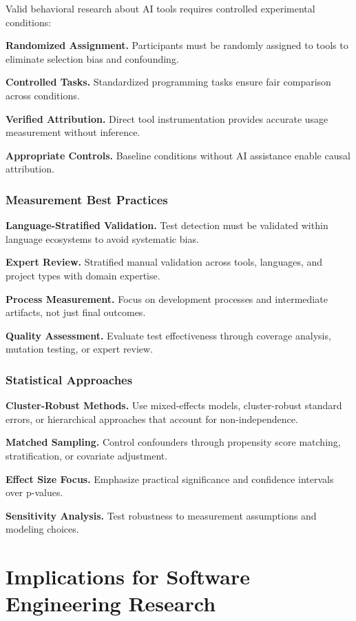 \documentclass[conference]{IEEEtran}
\begin{document}
Valid behavioral research about AI tools requires controlled experimental conditions:

\textbf{Randomized Assignment.} Participants must be randomly assigned to tools to eliminate selection bias and confounding.

\textbf{Controlled Tasks.} Standardized programming tasks ensure fair comparison across conditions.

\textbf{Verified Attribution.} Direct tool instrumentation provides accurate usage measurement without inference.

\textbf{Appropriate Controls.} Baseline conditions without AI assistance enable causal attribution.

\subsubsection{Measurement Best Practices}

\textbf{Language-Stratified Validation.} Test detection must be validated within language ecosystems to avoid systematic bias.

\textbf{Expert Review.} Stratified manual validation across tools, languages, and project types with domain expertise.

\textbf{Process Measurement.} Focus on development processes and intermediate artifacts, not just final outcomes.

\textbf{Quality Assessment.} Evaluate test effectiveness through coverage analysis, mutation testing, or expert review.

\subsubsection{Statistical Approaches}

\textbf{Cluster-Robust Methods.} Use mixed-effects models, cluster-robust standard errors, or hierarchical approaches that account for non-independence.

\textbf{Matched Sampling.} Control confounders through propensity score matching, stratification, or covariate adjustment.

\textbf{Effect Size Focus.} Emphasize practical significance and confidence intervals over p-values.

\textbf{Sensitivity Analysis.} Test robustness to measurement assumptions and modeling choices.

\section{Implications for Software Engineering Research}
\end{document}
